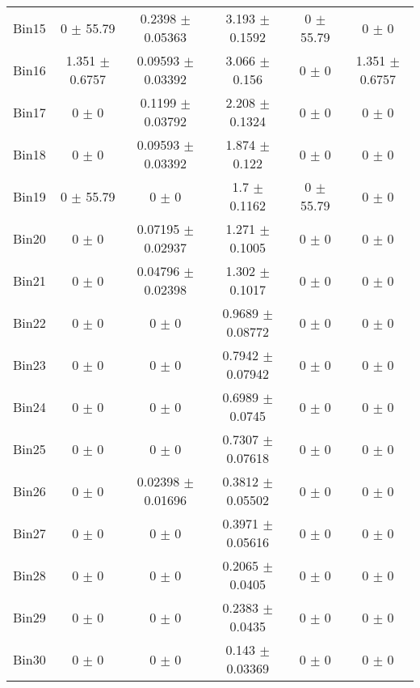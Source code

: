 \begin{tabular}{@{\extracolsep{4pt}}lccccc@{}}
     Bin15 & 0 $\pm$ 55.79 & 0.2398 $\pm$ 0.05363 & 3.193 $\pm$ 0.1592 & 0 $\pm$ 55.79 & 0 $\pm$ 0 \\ 
     Bin16 & 1.351 $\pm$ 0.6757 & 0.09593 $\pm$ 0.03392 & 3.066 $\pm$ 0.156 & 0 $\pm$ 0 & 1.351 $\pm$ 0.6757 \\ 
     Bin17 & 0 $\pm$ 0 & 0.1199 $\pm$ 0.03792 & 2.208 $\pm$ 0.1324 & 0 $\pm$ 0 & 0 $\pm$ 0 \\ 
     Bin18 & 0 $\pm$ 0 & 0.09593 $\pm$ 0.03392 & 1.874 $\pm$ 0.122 & 0 $\pm$ 0 & 0 $\pm$ 0 \\ 
     Bin19 & 0 $\pm$ 55.79 & 0 $\pm$ 0 & 1.7 $\pm$ 0.1162 & 0 $\pm$ 55.79 & 0 $\pm$ 0 \\ 
     Bin20 & 0 $\pm$ 0 & 0.07195 $\pm$ 0.02937 & 1.271 $\pm$ 0.1005 & 0 $\pm$ 0 & 0 $\pm$ 0 \\ 
     Bin21 & 0 $\pm$ 0 & 0.04796 $\pm$ 0.02398 & 1.302 $\pm$ 0.1017 & 0 $\pm$ 0 & 0 $\pm$ 0 \\ 
     Bin22 & 0 $\pm$ 0 & 0 $\pm$ 0 & 0.9689 $\pm$ 0.08772 & 0 $\pm$ 0 & 0 $\pm$ 0 \\ 
     Bin23 & 0 $\pm$ 0 & 0 $\pm$ 0 & 0.7942 $\pm$ 0.07942 & 0 $\pm$ 0 & 0 $\pm$ 0 \\ 
     Bin24 & 0 $\pm$ 0 & 0 $\pm$ 0 & 0.6989 $\pm$ 0.0745 & 0 $\pm$ 0 & 0 $\pm$ 0 \\ 
     Bin25 & 0 $\pm$ 0 & 0 $\pm$ 0 & 0.7307 $\pm$ 0.07618 & 0 $\pm$ 0 & 0 $\pm$ 0 \\ 
     Bin26 & 0 $\pm$ 0 & 0.02398 $\pm$ 0.01696 & 0.3812 $\pm$ 0.05502 & 0 $\pm$ 0 & 0 $\pm$ 0 \\ 
     Bin27 & 0 $\pm$ 0 & 0 $\pm$ 0 & 0.3971 $\pm$ 0.05616 & 0 $\pm$ 0 & 0 $\pm$ 0 \\ 
     Bin28 & 0 $\pm$ 0 & 0 $\pm$ 0 & 0.2065 $\pm$ 0.0405 & 0 $\pm$ 0 & 0 $\pm$ 0 \\ 
     Bin29 & 0 $\pm$ 0 & 0 $\pm$ 0 & 0.2383 $\pm$ 0.0435 & 0 $\pm$ 0 & 0 $\pm$ 0 \\ 
     Bin30 & 0 $\pm$ 0 & 0 $\pm$ 0 & 0.143 $\pm$ 0.03369 & 0 $\pm$ 0 & 0 $\pm$ 0 \\ 
\hline\hline
  \end{tabular}
